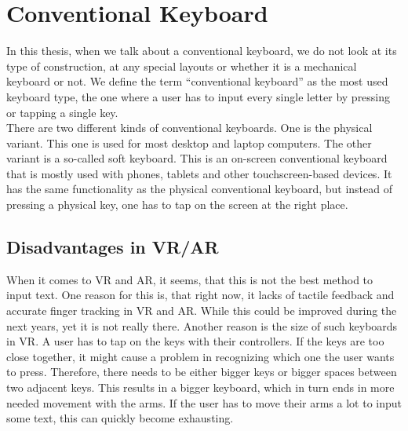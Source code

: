 \section{Conventional Keyboard}
In this thesis, when we talk about a conventional keyboard, we do not look at its type of construction, at any special layouts or whether it is a mechanical keyboard or not. We define the term ``conventional keyboard'' as the most used keyboard type, the one where a user has to input every single letter by pressing or tapping a single key.\\
There are two different kinds of conventional keyboards. One is the physical variant. This one is used for most desktop and laptop computers. The other variant is a so-called soft keyboard. This is an on-screen conventional keyboard that is mostly used with phones, tablets and other touchscreen-based devices. It has the same functionality as the physical conventional keyboard, but instead of pressing a physical key, one has to tap on the screen at the right place.\\

\subsection{Disadvantages in VR/AR}
When it comes to VR and AR, it seems, that this is not the best method to input text. One reason for this is, that right now, it lacks of tactile feedback and accurate finger tracking in VR and AR. While this could be improved during the next years, yet it is not really there. Another reason is the size of such keyboards in VR. A user has to tap on the keys with their controllers. If the keys are too close together, it might cause a problem in recognizing which one the user wants to press. Therefore, there needs to be either bigger keys or bigger spaces between two adjacent keys. This results in a bigger keyboard, which in turn ends in more needed movement with the arms. If the user has to move their arms a lot to input some text, this can quickly become exhausting.

